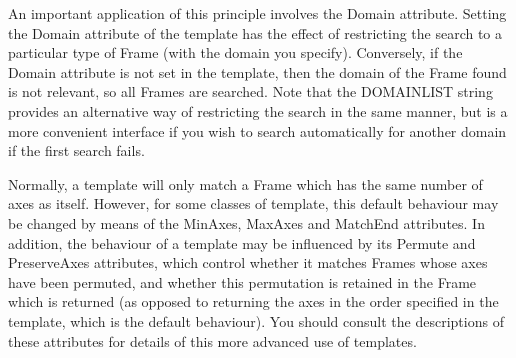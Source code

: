 \documentclass[twoside,11pt]{article}
\newcommand{\htmlref}[2]{#1}
\begin{document}
{{{         \sstitem
         An important application of this principle involves the Domain
         attribute. Setting the Domain attribute of the template has the
         effect of restricting the search to a particular type of Frame
         (with the domain you specify).  Conversely, if the Domain
         attribute is not set in the template, then the domain of the
         Frame found is not relevant, so all Frames are searched.  Note
         that the
         DOMAINLIST string provides an alternative way of restricting the
         search in the same manner, but is a more convenient interface if
         you wish to search automatically for another domain if the first
         search fails.

         \sstitem
         Normally, a template will only match a Frame which has the
         same number of axes as itself. However, for some classes of
         template, this default behaviour may be changed by means of the
         \htmlref{MinAxes}{MinAxes}, MaxAxes and \htmlref{MatchEnd}{MatchEnd} attributes. In addition, the
         behaviour of a template may be influenced by its Permute and
         PreserveAxes attributes, which control whether it matches Frames
         whose axes have been permuted, and whether this permutation is
         retained in the Frame which is returned (as opposed to returning
         the axes in the order specified in the template, which is the
         default behaviour). You should consult the descriptions of these
         attributes for details of this more advanced use of templates.
      }
   }
}
\end{document}
